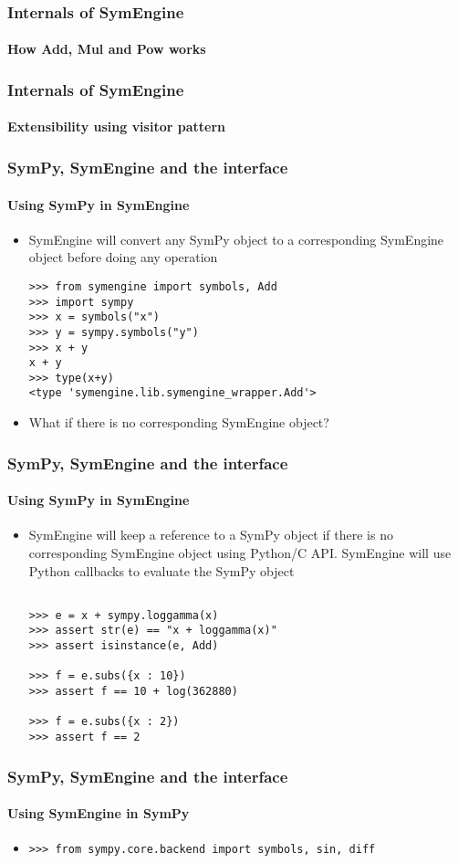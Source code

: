 \documentclass{beamer}
\begin{document}
\begin{frame}
\frametitle{Internals of SymEngine}
\framesubtitle{How Add, Mul and Pow works}
\end{frame}


\begin{frame}
\frametitle{Internals of SymEngine}
\framesubtitle{Extensibility using visitor pattern}
\end{frame}


\begin{frame}[fragile]
\frametitle{SymPy, SymEngine and the interface}
\framesubtitle{Using SymPy in SymEngine}
\begin{itemize}
\item
SymEngine will convert any SymPy object to a corresponding SymEngine object before doing any operation

\begin{verbatim}
>>> from symengine import symbols, Add
>>> import sympy
>>> x = symbols("x")
>>> y = sympy.symbols("y")
>>> x + y
x + y
>>> type(x+y)
<type 'symengine.lib.symengine_wrapper.Add'>
\end{verbatim}
\item
What if there is no corresponding SymEngine object?
\end{itemize}
\end{frame}


\begin{frame}[fragile]
\frametitle{SymPy, SymEngine and the interface}
\framesubtitle{Using SymPy in SymEngine}
\begin{itemize}
\item
SymEngine will keep a reference to a SymPy object if there is no corresponding SymEngine object using Python/C API.
SymEngine will use Python callbacks to evaluate the SymPy object

\begin{verbatim}

>>> e = x + sympy.loggamma(x)
>>> assert str(e) == "x + loggamma(x)"
>>> assert isinstance(e, Add)

>>> f = e.subs({x : 10})
>>> assert f == 10 + log(362880)

>>> f = e.subs({x : 2})
>>> assert f == 2
\end{verbatim}
\end{itemize}
\end{frame}


\begin{frame}[fragile]
\frametitle{SymPy, SymEngine and the interface}
\framesubtitle{Using SymEngine in SymPy}
\begin{itemize}
\item
\begin{verbatim}
>>> from sympy.core.backend import symbols, sin, diff
\end{verbatim}
\end{itemize}
\end{frame}
\end{document}

